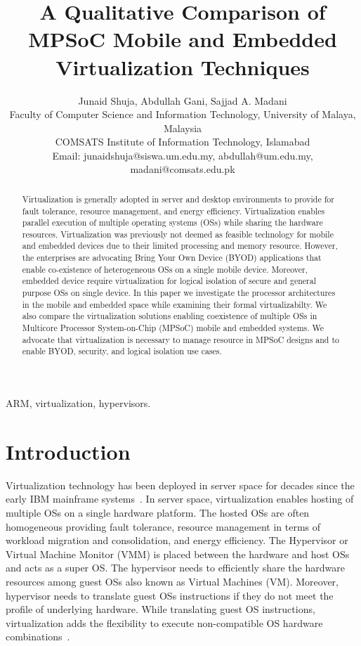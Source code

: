 \documentclass[journal, 10pt]{IEEEtran}
\begin{document}
\title{A Qualitative Comparison of MPSoC Mobile and Embedded Virtualization Techniques}
\author{Junaid Shuja, Abdullah Gani, Sajjad A. Madani \\  Faculty of Computer Science and Information Technology, University of Malaya, Malaysia\\  COMSATS Institute of Information Technology, Islamabad\\ Email: junaidshuja@siswa.um.edu.my, abdullah@um.edu.my, madani@comsats.edu.pk} 

\maketitle

\begin{abstract}
Virtualization is generally adopted in server and desktop environments to provide for fault tolerance, resource management, and energy efficiency. Virtualization enables parallel execution of multiple operating systems (OSs) while sharing the hardware resources. Virtualization was previously not deemed as feasible technology for mobile and embedded devices due to their limited processing and memory resource. However, the enterprises are advocating Bring Your Own Device (BYOD) applications that enable co-existence of heterogeneous OSs on a single mobile device. Moreover, embedded device require virtualization for logical isolation of secure and general purpose OSs on single device. In this paper we investigate the processor architectures in the mobile and embedded space while examining their formal virtualizabilty. We also compare the virtualization solutions enabling coexistence of multiple OSs in Multicore Processor System-on-Chip (MPSoC) mobile and embedded systems. We advocate that virtualization is necessary to manage resource in MPSoC designs and to enable BYOD, security, and logical isolation use cases.
\end{abstract}

\begin{IEEEkeywords}
ARM, virtualization, hypervisors.
\end{IEEEkeywords}

\section{Introduction}\label{sec:intro}
Virtualization technology has been deployed in server space for decades since the early IBM mainframe systems~\cite{Popek1974}. In server space, virtualization enables hosting of multiple OSs on a single hardware platform. The hosted OSs are often homogeneous providing fault tolerance, resource management in terms of workload migration and consolidation, and energy efficiency. The Hypervisor or Virtual Machine Monitor (VMM) is placed between the hardware and host OSs and acts as a super OS. The hypervisor needs to efficiently share the hardware resources among guest OSs also known as Virtual Machines (VM). Moreover, hypervisor needs to translate guest OSs instructions if they do not meet the profile of underlying hardware. While translating guest OS instructions, virtualization adds the flexibility to execute non-compatible OS hardware combinations~\cite{Aguiar2010}.
\end{document}
